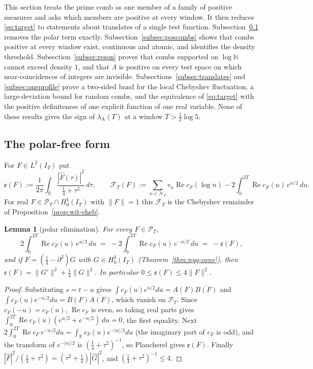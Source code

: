 \documentclass[11pt]{amsart}
\newtheorem{lemma}[theorem]{Lemma}
\theoremstyle{definition}
\theoremstyle{remark}
\newcommand{\R}{\mathbb R}
\newcommand{\N}{\mathbb N}
\newcommand{\Rel}{\operatorname{Re}}
\newcommand{\PT}{\mathcal P_T}
\newcommand{\IT}{I_T}
\newcommand{\lamA}{\lambda_{\mathrm A}(T)}
\newcommand{\Fh}{\widehat F}
\newcommand{\cF}{c_F}
\newcommand{\NT}{\mathcal N_T}
\begin{document}
This section treats the prime comb as one member of a family of positive measures and asks which members
are positive at every window. It then reduces \eqref{eq:target} to statements about translates of a single
test function. Subsection~\ref{subsec:polarfree} removes the polar term exactly. Subsection~\ref{subsec:poscombs}
shows that combs positive at every window exist, continuous and atomic, and identifies the density threshold.
Subsection~\ref{subsec:reson} proves that combs supported on $\log\N$ cannot exceed density $1$, and that $\Lambda$
is positive on every test space on which near-coincidences of integers are invisible.
Subsections~\ref{subsec:translates} and \ref{subsec:oneprofile} prove a two-sided band for the local Chebyshev
fluctuation, a large-deviation bound for random combs, and the equivalence of \eqref{eq:target} with the positive
definiteness of one explicit function of one real variable. None of these results gives the sign of $\lamA$ at a
window $T>\frac12\log5$.

\subsection{The polar-free form}\label{subsec:polarfree}
For $F\in L^2(\IT)$ put
\[
\mathfrak e(F):=\frac1{2\pi}\int_\R\frac{|\Fh(\tau)|^2}{\frac14+\tau^2}\,d\tau ,\qquad
\mathcal F_T(F):=\sum_{n\in\NT}v_n\Rel\cF(\log n)-2\int_0^{2T}\Rel\cF(u)\,e^{u/2}\,du .
\]
For real $F\in\PT\cap H^1_0(\IT)$ with $\|F\|=1$ this $\mathcal F_T$ is the Chebyshev remainder of
Proposition~\ref{prop:wit-cheb}.

\begin{lemma}[polar elimination]\label{lem:polarelim}
For every $F\in\PT$,
\[
2\int_0^{2T}\Rel\cF(u)\,e^{u/2}\,du\;=\;-2\int_0^{2T}\Rel\cF(u)\,e^{-u/2}\,du\;=\;-\mathfrak e(F),
\]
and if $F=(\frac14-\partial^2)G$ with $G\in H^2_0(\IT)$ (Theorem~\ref{thm:nyq-cone}), then
$\mathfrak e(F)=\|G'\|^2+\frac14\|G\|^2$. In particular $0\le\mathfrak e(F)\le4\|F\|^2$.
\end{lemma}

\begin{proof}
Substituting $s=t-u$ gives $\int\cF(u)e^{u/2}du=A(F)\overline{B(F)}$ and
$\int\cF(u)e^{-u/2}du=B(F)\overline{A(F)}$, which vanish on $\PT$. Since $\cF(-u)=\overline{\cF(u)}$, $\Rel\cF$ is even, so taking real parts gives
$\int_0^{2T}\Rel\cF(u)(e^{u/2}+e^{-u/2})\,du=0$, the first equality. Next
$2\int_0^{2T}\Rel\cF\,e^{-u/2}du=\int_\R\cF(u)e^{-|u|/2}du$ (the imaginary part of $\cF$ is odd), and the transform of
$e^{-|u|/2}$ is $(\frac14+\tau^2)^{-1}$, so Plancherel gives $\mathfrak e(F)$. Finally
$|\Fh|^2/(\frac14+\tau^2)=(\tau^2+\frac14)|\widehat G|^2$, and $(\frac14+\tau^2)^{-1}\le4$.
\end{proof}
\end{document}
